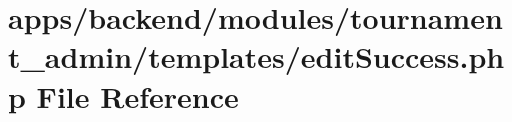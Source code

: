 \hypertarget{backend_2modules_2tournament__admin_2templates_2edit_success_8php}{\section{apps/backend/modules/tournament\-\_\-admin/templates/edit\-Success.php File Reference}
\label{backend_2modules_2tournament__admin_2templates_2edit_success_8php}
}
